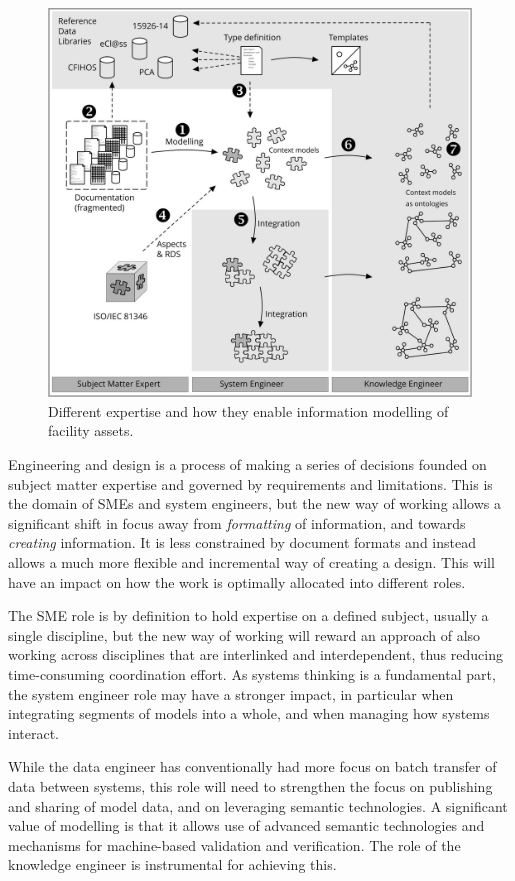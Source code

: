 \documentclass[../main.tex]{subfiles}
\begin{document}
\begin{figure}[htb]
  \centering
  \includegraphics[width=1\textwidth]{img/IMFmanual-img011.jpg}
  \caption{Different expertise and how they enable information modelling of facility assets.}
  \label{fig:Figure 11}
\end{figure}

Engineering and design is a process of making a series of decisions founded on subject matter expertise and governed
by requirements and limitations. This is the domain of SMEs and system engineers, but the new way of working allows a
significant shift in focus away from \emph{formatting} of information, and towards \emph{creating} information.
It is less constrained by document formats and instead allows a much more flexible and incremental way of creating a
design. This will have an impact on how the work is optimally allocated into different roles.

The SME role is by definition to hold expertise on a defined subject, usually a single discipline, but the new way of
working will reward an approach of also working across disciplines that are interlinked and interdependent, thus
reducing time-consuming coordination effort. As systems thinking is a fundamental part, the system engineer role may
have a stronger impact, in particular when integrating segments of models into a whole, and when managing how systems
interact.

While the data engineer has conventionally had more focus on batch transfer of data between systems, this role will
need to strengthen the focus on publishing and sharing of model data, and on leveraging semantic technologies. A
significant value of modelling is that it allows use of advanced semantic technologies and mechanisms for
machine-based validation and verification. The role of the knowledge engineer is instrumental for achieving this.
\end{document}
